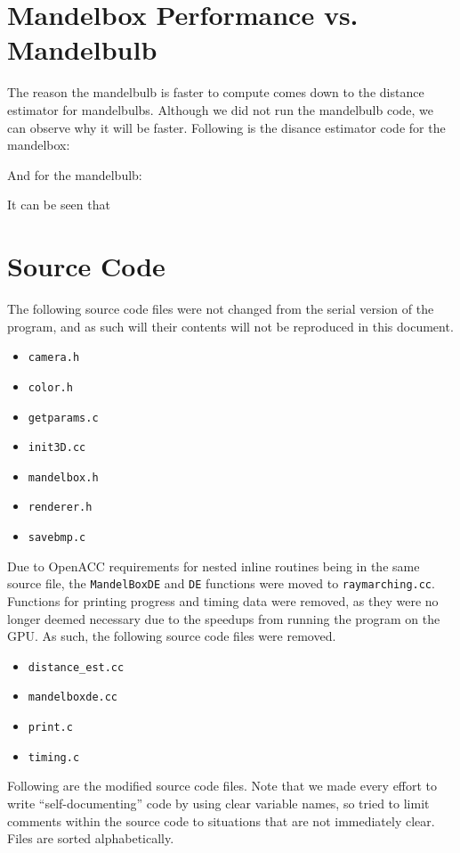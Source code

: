 \documentclass[11pt]{article}
\begin{document}
\section{Mandelbox Performance vs. Mandelbulb}
The reason the mandelbulb is faster to compute comes down to the distance estimator for mandelbulbs. Although we did not run the mandelbulb code, we can observe why it will be faster. Following is the disance estimator code for the mandelbox:


And for the mandelbulb:


It can be seen that 

\section{Source Code}
The following source code files were not changed from the serial version of the program, and as such will their contents will not be reproduced in this document.
\begin{itemize}
\item \texttt{camera.h}
\item \texttt{color.h}
\item \texttt{getparams.c}
\item \texttt{init3D.cc}
\item \texttt{mandelbox.h}
\item \texttt{renderer.h}
\item \texttt{savebmp.c}
\end{itemize}

Due to OpenACC requirements for nested inline routines being in the same source file, the \texttt{MandelBoxDE} and \texttt{DE} functions were moved to \texttt{raymarching.cc}. Functions for printing progress and timing data were removed, as they were no longer deemed necessary due to the speedups from running the program on the GPU. As such, the following source code files were removed.
\begin{itemize}
\item \texttt{distance\_est.cc}
\item \texttt{mandelboxde.cc}
\item \texttt{print.c}
\item \texttt{timing.c}
\end{itemize}

Following are the modified source code files. Note that we made every effort to write ``self-documenting'' code by using clear variable names, so tried to limit comments within the source code to situations that are not immediately clear. Files are sorted alphabetically.
\end{document}
